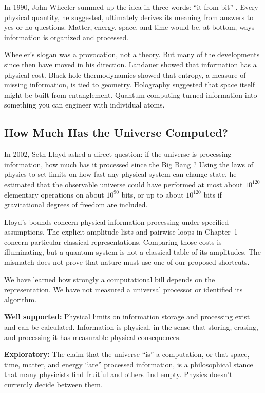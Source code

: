 In 1990, John Wheeler summed up the idea in three words: ``it from bit'' \cite{wheeler1990}. Every physical quantity, he suggested, ultimately derives its meaning from answers to yes-or-no questions. Matter, energy, space, and time would be, at bottom, ways information is organized and processed.

Wheeler's slogan was a provocation, not a theory. But many of the developments since then have moved in his direction. Landauer showed that information has a physical cost. Black hole thermodynamics showed that entropy, a measure of missing information, is tied to geometry. Holography suggested that space itself might be built from entanglement. Quantum computing turned information into something you can engineer with individual atoms.

\subsection{How Much Has the Universe Computed?}

In 2002, Seth Lloyd asked a direct question: if the universe is processing information, how much has it processed since the Big Bang \cite{lloyd2002}? Using the laws of physics to set limits on how fast any physical system can change state, he estimated that the observable universe could have performed at most about \(10^{120}\) elementary operations on about \(10^{90}\) bits, or up to about \(10^{120}\) bits if gravitational degrees of freedom are included.

Lloyd's bounds concern physical information processing under specified assumptions. The explicit amplitude lists and pairwise loops in Chapter~1 concern particular classical representations. Comparing those costs is illuminating, but a quantum system is not a classical table of its amplitudes. The mismatch does not prove that nature must use one of our proposed shortcuts.

We have learned how strongly a computational bill depends on the representation. We have not measured a universal processor or identified its algorithm.

\begin{researchnotebox}
\textbf{Well supported:} Physical limits on information storage and processing exist and can be calculated. Information is physical, in the sense that storing, erasing, and processing it has measurable physical consequences.

\textbf{Exploratory:} The claim that the universe ``is'' a computation, or that space, time, matter, and energy ``are'' processed information, is a philosophical stance that many physicists find fruitful and others find empty. Physics doesn't currently decide between them.
\end{researchnotebox}

